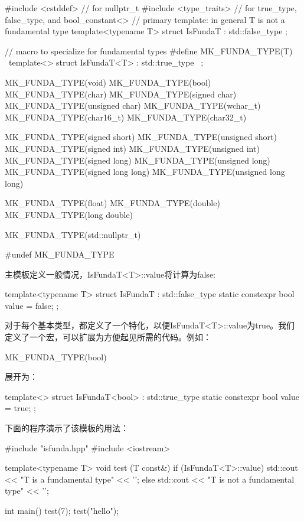 \begin{cpp}
#include <cstddef> // for nullptr_t
#include <type_traits> // for true_type, false_type, and
 bool_constant<>
// primary template: in general T is not a fundamental type
template<typename T>
struct IsFundaT : std::false_type {};

// macro to specialize for fundamental types
#define MK_FUNDA_TYPE(T) \
template<> struct IsFundaT<T> : std::true_type { \
};

MK_FUNDA_TYPE(void)
MK_FUNDA_TYPE(bool)
MK_FUNDA_TYPE(char)
MK_FUNDA_TYPE(signed char)
MK_FUNDA_TYPE(unsigned char)
MK_FUNDA_TYPE(wchar_t)
MK_FUNDA_TYPE(char16_t)
MK_FUNDA_TYPE(char32_t)

MK_FUNDA_TYPE(signed short)
MK_FUNDA_TYPE(unsigned short)
MK_FUNDA_TYPE(signed int)
MK_FUNDA_TYPE(unsigned int)
MK_FUNDA_TYPE(signed long)
MK_FUNDA_TYPE(unsigned long)
MK_FUNDA_TYPE(signed long long)
MK_FUNDA_TYPE(unsigned long long)

MK_FUNDA_TYPE(float)
MK_FUNDA_TYPE(double)
MK_FUNDA_TYPE(long double)

MK_FUNDA_TYPE(std::nullptr_t)

#undef MK_FUNDA_TYPE
\end{cpp}

主模板定义一般情况，IsFundaT<T>::value将计算为false:

\begin{cpp}
template<typename T>
struct IsFundaT : std::false_type {
	static constexpr bool value = false;
};
\end{cpp}

对于每个基本类型，都定义了一个特化，以便IsFundaT<T>::value为true。我们定义了一个宏，可以扩展为方便起见所需的代码。例如：

\begin{cpp}
MK_FUNDA_TYPE(bool)
\end{cpp}

展开为：

\begin{cpp}
template<> struct IsFundaT<bool> : std::true_type {
	static constexpr bool value = true;
};
\end{cpp}

下面的程序演示了该模板的用法：

\begin{cpp}
#include "isfunda.hpp"
#include <iostream>

template<typename T>
void test (T const&) {
	if (IsFundaT<T>::value) {
		std::cout << "T is a fundamental type" << '\n';
	}
	else {
		std::cout << "T is not a fundamental type" << '\n';
	}
}

int main() {
	test(7);
	test("hello");
}
\end{cpp}

